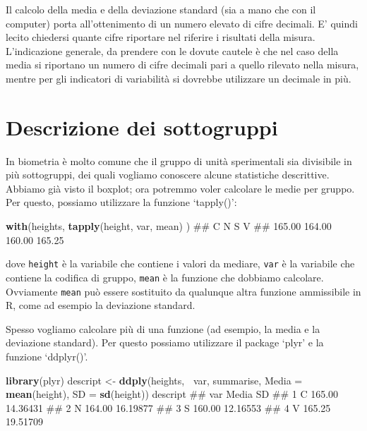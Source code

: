 \documentclass[a4paper,12pt,oneside]{book}
\newenvironment{Shaded}{\begin{snugshade}}{\end{snugshade}}
\newcommand{\KeywordTok}[1]{\textcolor[rgb]{0.13,0.29,0.53}{\textbf{#1}}}
\newcommand{\DataTypeTok}[1]{\textcolor[rgb]{0.13,0.29,0.53}{#1}}
\newcommand{\StringTok}[1]{\textcolor[rgb]{0.31,0.60,0.02}{#1}}
\newcommand{\OperatorTok}[1]{\textcolor[rgb]{0.81,0.36,0.00}{\textbf{#1}}}
\newcommand{\NormalTok}[1]{#1}
\theoremstyle{definition}
\theoremstyle{definition}
\theoremstyle{definition}
\theoremstyle{remark}
\begin{document}
Il calcolo della media e della deviazione standard (sia a mano che con
il computer) porta all'ottenimento di un numero elevato di cifre
decimali. E' quindi lecito chiedersi quante cifre riportare nel riferire
i risultati della misura. L'indicazione generale, da prendere con le
dovute cautele è che nel caso della media si riportano un numero di
cifre decimali pari a quello rilevato nella misura, mentre per gli
indicatori di variabilità si dovrebbe utilizzare un decimale in più.

\section*{Descrizione dei
sottogruppi}\label{descrizione-dei-sottogruppi}

In biometria è molto comune che il gruppo di unità sperimentali sia
divisibile in più sottogruppi, dei quali vogliamo conoscere alcune
statistiche descrittive. Abbiamo già visto il boxplot; ora potremmo
voler calcolare le medie per gruppo. Per questo, possiamo utilizzare la
funzione `tapply()':

\begin{Shaded}
\begin{Highlighting}[]
\KeywordTok{with}\NormalTok{(heights, }\KeywordTok{tapply}\NormalTok{(height, var, mean) )}
\NormalTok{##      C      N      S      V }
\NormalTok{## 165.00 164.00 160.00 165.25}
\end{Highlighting}
\end{Shaded}

dove \texttt{height} è la variabile che contiene i valori da mediare,
\texttt{var} è la variabile che contiene la codifica di gruppo,
\texttt{mean} è la funzione che dobbiamo calcolare. Ovviamente
\texttt{mean} può essere sostituito da qualunque altra funzione
ammissibile in R, come ad esempio la deviazione standard.

Spesso vogliamo calcolare più di una funzione (ad esempio, la media e la
deviazione standard). Per questo possiamo utilizzare il package `plyr' e
la funzione `ddplyr()'.

\begin{Shaded}
\begin{Highlighting}[]
\KeywordTok{library}\NormalTok{(plyr)}
\NormalTok{descript <-}\StringTok{ }\KeywordTok{ddply}\NormalTok{(heights, }\OperatorTok{~}\NormalTok{var, summarise, }
                  \DataTypeTok{Media =} \KeywordTok{mean}\NormalTok{(height), }
                  \DataTypeTok{SD =} \KeywordTok{sd}\NormalTok{(height))}
\NormalTok{descript}
\NormalTok{##   var  Media       SD}
\NormalTok{## 1   C 165.00 14.36431}
\NormalTok{## 2   N 164.00 16.19877}
\NormalTok{## 3   S 160.00 12.16553}
\NormalTok{## 4   V 165.25 19.51709}
\end{Highlighting}
\end{Shaded}
\end{document}
